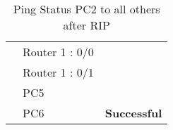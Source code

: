 \documentclass[a4paper,11pt]{article}
\begin{document}
\begin{enumerate}
\begin{table}[H]
\begin{tabular}{| m{10em}| m{10em}| m{10em} |}
                  {\cellcolor[rgb]{0.141,0.525,1}}                                & Router 1 : 0/0       & {\cellcolor[rgb]{0.42,0.988,0.827}}                                        \\
                  \hhline{|>{\arrayrulecolor[rgb]{0.141,0.525,1}}->{\arrayrulecolor{black}}->{\arrayrulecolor[rgb]{0.42,0.988,0.827}}->{\arrayrulecolor{black}}|}
                  {\cellcolor[rgb]{0.141,0.525,1}}                                & Router 1 : 0/1       & {\cellcolor[rgb]{0.42,0.988,0.827}}                                        \\
                  \hhline{|>{\arrayrulecolor[rgb]{0.141,0.525,1}}->{\arrayrulecolor{black}}->{\arrayrulecolor[rgb]{0.42,0.988,0.827}}->{\arrayrulecolor{black}}|}
                  {\cellcolor[rgb]{0.141,0.525,1}}                                & PC5                  & {\cellcolor[rgb]{0.42,0.988,0.827}}                                        \\
                  \hhline{|>{\arrayrulecolor[rgb]{0.141,0.525,1}}->{\arrayrulecolor{black}}->{\arrayrulecolor[rgb]{0.42,0.988,0.827}}->{\arrayrulecolor{black}}|}
                  \multirow{-10}{*}{{\cellcolor[rgb]{0.141,0.525,1}}\textbf{PC2}} & PC6                  & \multirow{-10}{*}{{\cellcolor[rgb]{0.42,0.988,0.827}} \textbf{Successful}} \\
                  \hline
              \end{tabular}
              \caption{ Ping Status PC2 to all others after RIP}
          \end{table}



          \begin{table}[H]
              \centering


\end{table}
\end{enumerate}
\end{document}
